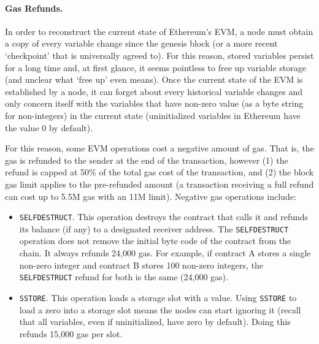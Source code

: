 

\paragraph{Gas Refunds.} In order to reconstruct the current state of Ethereum's EVM, a node must obtain a copy of every variable change since the genesis block (or a more recent `checkpoint' that is universally agreed to). For this reason, stored variables persist for a long time and, at first glance, it seems pointless to free up variable storage (and unclear what `free up' even means). Once the current state of the EVM is established by a node, it can forget about every historical variable changes and only concern itself with the variables that have non-zero value (as a byte string for non-integers) in the current state (uninitialized variables in Ethereum have the value 0 by default).

For this reason, some EVM operations cost a negative amount of gas. That is, the gas is refunded to the sender at the end of the transaction, however (1) the refund is capped at 50\% of the total gas cost of the transaction, and (2) the block gas limit applies to the pre-refunded amount (\ie a transaction receiving a full refund can cost up to 5.5M gas with an 11M limit). Negative gas operations include:

\begin{itemize}

\item \texttt{SELFDESTRUCT}. This operation destroys the contract that calls it and refunds its balance (if any) to a designated receiver address. The  \texttt{SELFDESTRUCT} operation does not remove the initial byte code of the contract from the chain. It always refunds 24,000 gas. For example, if contract A stores a single non-zero integer and contract B stores 100 non-zero integers, the \texttt{SELFDESTRUCT} refund for both is the same (24,000 gas).


\item \texttt{SSTORE}. This operation loads a storage slot with a value. Using \texttt{SSTORE} to load a zero into a storage slot means the nodes can start ignoring it (recall that all variables, even if uninitialized, have zero by default). Doing this refunds 15,000 gas per slot. 

\end{itemize} 

